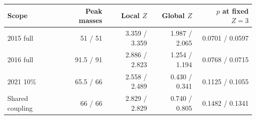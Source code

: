 \begin{center}\small\begin{tabular}{lrrrr}\toprule
Scope & Peak masses & Local $Z$ & Global $Z$ & $p$ at fixed $Z=3$\\\midrule
2015 full & 51 / 51 & 3.359 / 3.359 & 1.987 / 2.065 & 0.0701 / 0.0597\\
2016 full & 91.5 / 91 & 2.886 / 2.823 & 1.254 / 1.194 & 0.0768 / 0.0715\\
2021 10\% & 65.5 / 66 & 2.558 / 2.489 & 0.430 / 0.341 & 0.1125 / 0.1055\\
Shared coupling & 66 / 66 & 2.829 / 2.829 & 0.740 / 0.805 & 0.1482 / 0.1341\\
\bottomrule\end{tabular}\end{center}
